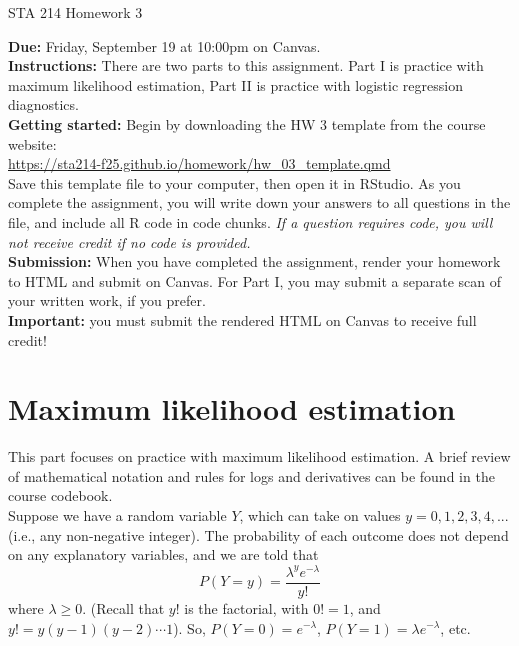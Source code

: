 \documentclass[11pt]{article}
\begin{document}
\begin{center}
\Large
STA 214 Homework 3\\
\normalsize
\vspace{5mm}
\end{center}

\noindent \textbf{Due:} Friday, September 19 at 10:00pm on Canvas.\\ 

\noindent \textbf{Instructions:} There are two parts to this assignment. Part I is practice with maximum likelihood estimation, Part II is practice with logistic regression diagnostics.\\

\noindent \textbf{Getting started:} Begin by downloading the HW 3 template from the course website:\\

\url{https://sta214-f25.github.io/homework/hw_03_template.qmd}\\

\noindent Save this template file to your computer, then open it in RStudio. As you complete the assignment, you will write down your answers to all questions in the file, and include all R code in code chunks. \textit{If a question requires code, you will not receive credit if no code is provided.}\\

\noindent \textbf{Submission:} When you have completed the assignment, render your homework to HTML and submit on Canvas. For Part I, you may submit a separate scan of your written work, if you prefer.\\

\noindent \textbf{Important:} you must submit the rendered HTML on Canvas to receive full credit!

\section{Maximum likelihood estimation}

This part focuses on practice with maximum likelihood estimation. A brief review of mathematical notation and rules for logs and derivatives can be found in the course codebook.\\

\noindent Suppose we have a random variable $Y$, which can take on values $y = 0, 1, 2, 3, 4,...$ (i.e., any non-negative integer). The probability of each outcome does not depend on any explanatory variables, and we are told that
$$P(Y = y) = \dfrac{\lambda^y e^{-\lambda}}{y!}$$
where $\lambda \geq 0$. (Recall that $y!$ is the factorial, with $0! = 1$, and $y! = y(y - 1)(y-2)\cdots 1$). So, $P(Y = 0) = e^{-\lambda}$, $P(Y = 1) = \lambda e^{-\lambda}$, etc.
\end{document}
